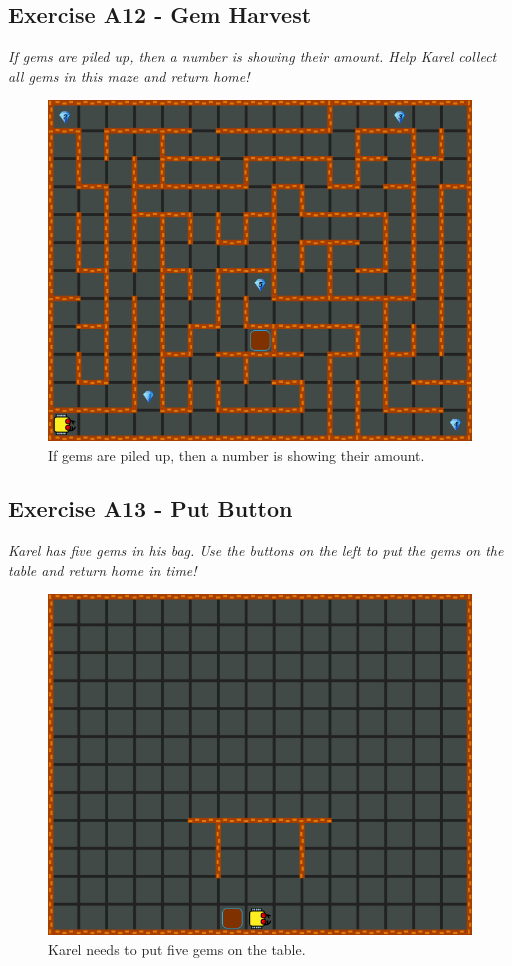\subsection{Exercise A12 - Gem Harvest}

{\em If gems are piled up, then a number is showing their amount. 
Help Karel collect all gems in this maze and return home!}\\[-7mm]

\begin{figure}[!ht]
\begin{center}
\includegraphics[height=0.4\textwidth]{imgk/a12.png}
\end{center}
\vspace{-4mm}
\caption{If gems are piled up, then a number is showing their amount.}
\label{fig:a12}
\vspace{-10mm}
\end{figure}
\noindent

\subsection{Exercise A13 - Put Button}

{\em Karel has five gems in his bag. Use the buttons on the left to put the gems on the table and 
return home in time!}\\[-7mm]

\begin{figure}[!ht]
\begin{center}
\includegraphics[height=0.4\textwidth]{imgk/a13.png}
\end{center}
\vspace{-4mm}
\caption{Karel needs to put five gems on the table.}
\label{fig:a13}
\vspace{-4mm}
\end{figure}
\noindent

